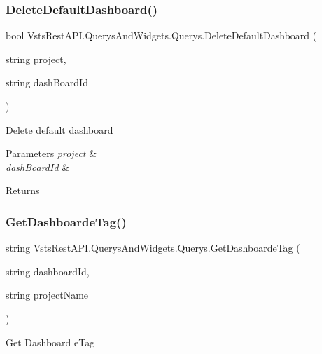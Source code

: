 \subsubsection{\texorpdfstring{Delete\+Default\+Dashboard()}{DeleteDefaultDashboard()}}
{\footnotesize\ttfamily bool Vsts\+Rest\+A\+P\+I.\+Querys\+And\+Widgets.\+Querys.\+Delete\+Default\+Dashboard (\begin{DoxyParamCaption}\item[{string}]{project,  }\item[{string}]{dash\+Board\+Id }\end{DoxyParamCaption})}



Delete default dashboard 


\begin{DoxyParams}{Parameters}
{\em project} & \\
\hline
{\em dash\+Board\+Id} & \\
\hline
\end{DoxyParams}
\begin{DoxyReturn}{Returns}

\end{DoxyReturn}
\mbox{\label{class_vsts_rest_a_p_i_1_1_querys_and_widgets_1_1_querys_a367ee3271ff58e50273a73e2bb5da282}} 
\subsubsection{\texorpdfstring{Get\+Dashboarde\+Tag()}{GetDashboardeTag()}}
{\footnotesize\ttfamily string Vsts\+Rest\+A\+P\+I.\+Querys\+And\+Widgets.\+Querys.\+Get\+Dashboarde\+Tag (\begin{DoxyParamCaption}\item[{string}]{dashboard\+Id,  }\item[{string}]{project\+Name }\end{DoxyParamCaption})}



Get Dashboard e\+Tag 



